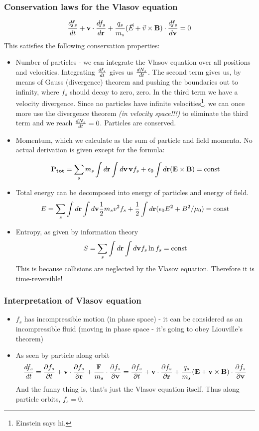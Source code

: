 \subsubsection{Conservation laws for the Vlasov equation}
\[\frac{d f_s}{d t} + \mathbf{v} \cdot \frac{d f_s}{d \mathbf{r}} + \frac{q_s}{m_s} (\vec{E} + \vec{v} \times \mathbf{B}) \cdot \frac{d f_s}{d \mathbf{v}} = 0\]
This satisfies the following conservation properties:
\begin{itemize}
\item Number of particles - we can integrate the Vlasov equation over all positions and velocities. Integrating $\frac{d f_s}{d t}$ gives us $\frac{d N_s}{d t}$. The second term gives us, by means of Gauss (divergence) theorem and pushing the boundaries out to infinity, where $f_s$ should decay to zero, zero. In the third term we have a velocity divergence. Since no particles have infinite velocities\footnote{Einstein says hi.}, we can once more use the divergence theorem \textit{(in velocity space!!!)} to eliminate the third term and we reach $\frac{d N_s}{d t} = 0$. Particles are conserved.
\item Momentum, which we calculate as the sum of particle and field momenta. No actual derivation is given except for the formula:

\[ \mathbf{P_{tot}} = \sum_s m_s \int d\mathbf{r} \int d\mathbf{v} \, \mathbf{v} f_s + \epsilon_0 \int d\mathbf{r} (\mathbf{E} \times \mathbf{B}) = \text{const}  \]

\item Total energy can be decomposed into energy of particles and energy of field.
\[ E= \sum_s \int d\mathbf{r} \int d\mathbf{v} \frac{1}{2} m_s v^2 f_s + \frac{1}{2} \int d\mathbf{r} (\epsilon_0 E^2 + B^2/\mu_0) = \text{const} \]

\item Entropy, as given by information theory
\[ S = \sum_s \int d\mathbf{r} \int d\mathbf{v} f_s \ln{f_s} = \text{const} \]
This is because collisions are neglected by the Vlasov equation. Therefore it is time-reversible!
\end{itemize}


\subsubsection{Interpretation of Vlasov equation}
\begin{itemize}
\item $f_s$ has incompressible motion (in phase space) - it can be considered as an incompressible fluid (moving in phase space - it's going to obey Liouville's theorem)
\item As seen by particle along orbit \[ \frac{d f_s}{d t} = \frac{\partial f_s}{\partial t} + \mathbf{v} \cdot \frac{\partial f_s}{\partial \mathbf{r}} + \frac{\mathbf{F}}{m_s} \cdot \frac{\partial f_s}{\partial \mathbf{v}} = \frac{\partial f_s}{\partial t} + \mathbf{v} \cdot \frac{\partial f_s}{\partial \mathbf{r}} + \frac{q_s}{m_s} (\mathbf{E} + \mathbf{v} \times \mathbf{B}) \cdot \frac{\partial f_s}{\partial \mathbf{v}} \]
And the funny thing is, that's just the Vlasov equation itself. Thus along particle orbits, $f_s = 0$.
\end{itemize}

